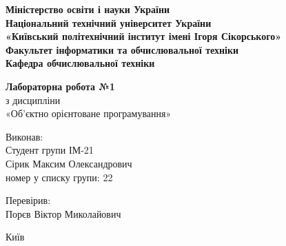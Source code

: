 \begin{titlepage}
      \begin{center}
      
        \Large
        
        \textbf{
            Міністерство освіти і науки України \\
            Національний технічний університет України \\
            «Київський політехнічний інститут імені Ігоря Сікорського»  \\
            Факультет інформатики та обчислювальної техніки \\
            Кафедра обчислювальної техніки \\
        }
        
        \vspace{7\baselineskip}
        \textbf{
            Лабораторна робота №1 \\
        }
        з дисципліни \\
        «Об’єктно орієнтоване програмування» \\

        \large
        \vspace{7\baselineskip}
        \begin{flushleft}
            Виконав: \\
            Студент групи ІМ-21 \\
            Сірик Максим Олександрович \\
            номер у списку групи: 22 \\
        \end{flushleft} 

        \begin{flushright}
            Перевірив: \\
            Порєв Віктор Миколайович \\
        \end{flushright}    
    
        \vfill
        
        \Large
        Київ \the\year{}
        \vspace*{-1\baselineskip}
      \end{center}
\end{titlepage}